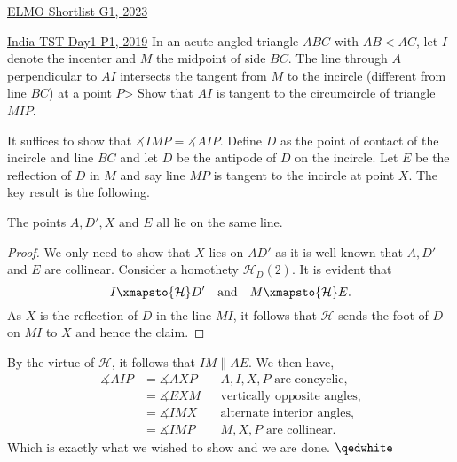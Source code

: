 \begin{problem}{14}{\href{https://artofproblemsolving.com/community/c6h3100572p28033718}{ELMO Shortlist G1, 2023}}
\begin{problem}{11}{\href{https://artofproblemsolving.com/community/q2h1876785p35453764}{India TST Day1-P1, 2019}} 
	In an acute angled triangle $ABC$ with $AB < AC$, let $I$ denote the incenter and $M$ the midpoint of side $BC$. The line through $A$ perpendicular to $AI$ intersects the tangent from $M$ to the incircle (different from line $BC$) at a point $P$> Show that $AI$ is tangent to the circumcircle of triangle $MIP$.
	\begin{solution} It suffices to show that $\measuredangle IMP=\measuredangle AIP$. Define $D$ as the point of contact of the incircle and line $BC$ and let $D$ be the antipode of $D$ on the incircle. Let $E$ be the reflection of $D$ in $M$ and say line $MP$ is tangent to the incircle at point $X$. The key result is the following.

	\begin{numclaim}{1}
		The points $A, D', X$ and $E$ all lie on the same line.
	\end{numclaim}
	\begin{proof} We only need to show that $X$ lies on $AD'$ as it is well known that $A, D'$ and $E$ are collinear. Consider a homothety $\mathcal{H}_D(2)$. It is evident that
$$I\xmapsto{\mathcal{H}}D'\quad\text{and}\quad M\xmapsto{\mathcal{H}} E.$$As $X$ is the reflection of $D$ in the line $MI$, it follows that $\mathcal{H}$ sends the foot of $D$ on $MI$ to $X$ and hence the claim.
	\end{proof}

	By the virtue of $\mathcal{H}$, it follows that $\overline{IM}\parallel \overline{AE}$. We then have,
\begin{align*} \measuredangle AIP &= \measuredangle AXP && \text{$A, I, X, P$ are concyclic,}\\ &= \measuredangle EXM && \text{vertically opposite angles,}\\ &= \measuredangle IMX && \text{alternate interior angles,}\\ &= \measuredangle IMP && \text{$M, X, P$ are collinear.} \end{align*}Which is exactly what we wished to show and we are done. $\qedwhite$
	\end{solution}
\end{problem}
	

\end{problem}
